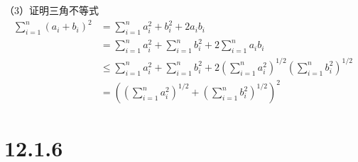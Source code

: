 \documentclass{article}
\begin{document}
（3）证明三角不等式
\begin{align*}
      \sum\limits_{i=1}^n (a_i + b_i)^2 & = \sum\limits_{i=1}^n a_i^2 + b_i^2 + 2a_ib_i                                                  \\
      & = \sum\limits_{i=1}^n a_i^2 + \sum\limits_{i=1}^n b_i^2 + 2 \sum\limits_{i=1}^n a_ib_i                                             \\
      & \leq \sum\limits_{i=1}^n a_i^2 + \sum\limits_{i=1}^n b_i^2 + 2 \left(\sum\limits_{i=1}^n a_i^2\right)^{1/2} \left(\sum\limits_{i=1}^n b_i^2\right)^{1/2} \\
      & = \left(\left(\sum\limits_{i=1}^n a_i^2\right)^{1/2} + \left(\sum\limits_{i=1}^n b_i^2\right)^{1/2}\right)^2
\end{align*}



\section*{12.1.6}
\end{document}
